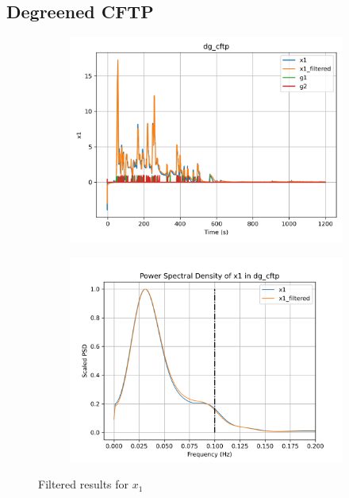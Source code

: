 \graphicspath{{Appendices/apx1_signal_est}}
\subsection{Degreened CFTP}

\begin{figure}[H]

\begin{minipage}{0.49\textwidth}
        \begin{figure}[H]
                \centering
                \includegraphics[width = \textwidth]{./figs/tst_filt/dg_cftp/x1.png}
        \end{figure}
\end{minipage}
\begin{minipage}{0.49\textwidth}
        \begin{figure}[H]
                \centering
                \includegraphics[width = \textwidth]{./figs/tst_filt/dg_cftp/x1_psd.png}
        \end{figure}
\end{minipage}
\caption{Filtered results for $x_1$}

\end{figure}


